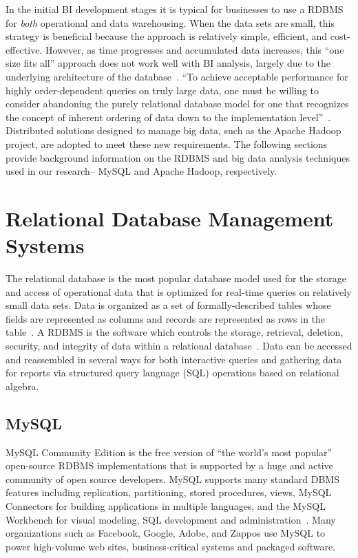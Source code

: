 In the initial BI development stages it is typical for businesses to use a RDBMS for \textit{both} operational and data warehousing. When the data sets are small, this strategy is beneficial because the approach is relatively simple, efficient, and cost-effective. However, as time progresses and accumulated data increases, this ``one size fits all'' approach does not work well with BI analysis, largely due to the underlying architecture of the database~\cite{stonebraker,jacobs2009pathologies}. ``To achieve acceptable performance for highly order-dependent queries on truly large data, one must be willing to consider abandoning the purely relational database model for one that recognizes the concept of inherent ordering of data down to the implementation level''~\cite{jacobs2009pathologies}. Distributed solutions designed to manage big data, such as the Apache Hadoop project, are adopted to meet these new requirements. The following sections provide background information on the RDBMS and big data analysis techniques used in our research-- MySQL and Apache Hadoop, respectively.

\section{Relational Database Management Systems}
The relational database is the most popular database model used for the storage and access of operational data that is optimized for real-time queries on relatively small data sets. Data is organized as a set of formally-described tables whose fields are represented as columns and records are represented as rows in the table~\cite{codd1970relational}. A RDBMS is the software which controls the storage, retrieval, deletion, security, and integrity of data within a relational database~\cite{amblers}. Data can be accessed and reassembled in several ways for both interactive queries and gathering data for reports via structured query language (SQL) operations based on relational algebra.

\subsection{MySQL}
MySQL Community Edition is the free version of ``the world's most popular'' open-source RDBMS implementations that is supported by a huge and active community of open source developers. MySQL supports many standard DBMS features including replication, partitioning, stored procedures, views, MySQL Connectors for building applications in multiple languages, and the MySQL Workbench for visual modeling, SQL development and administration~\cite{mysql}. Many organizations such as Facebook, Google, Adobe, and Zappos use MySQL to power high-volume web sites, business-critical systems and packaged software.

